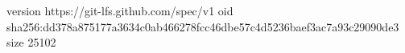 version https://git-lfs.github.com/spec/v1
oid sha256:dd378a875177a3634c0ab466278fcc46dbe57c4d5236baef3ac7a93c29090de3
size 25102
